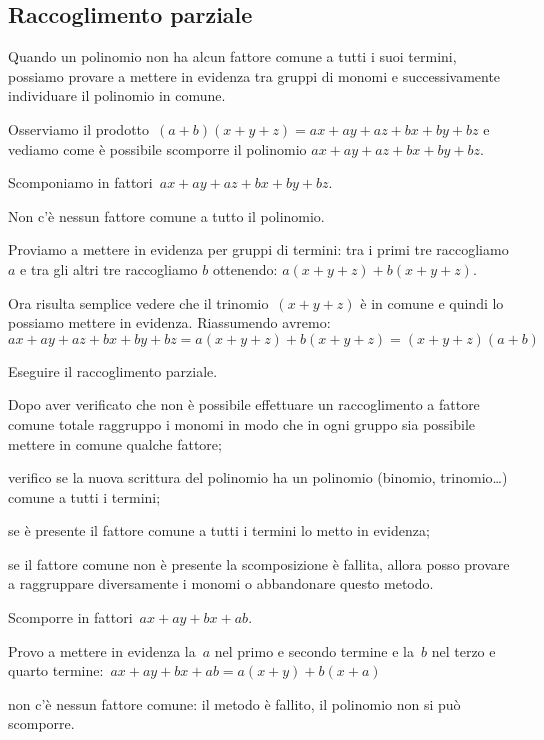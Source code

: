 \subsection{Raccoglimento parziale}
\label{subsec:divpol_raccoglimentoparziale}

Quando un polinomio non ha alcun fattore comune a tutti i suoi termini, 
possiamo provare a mettere in evidenza tra gruppi di monomi
e successivamente individuare il polinomio in comune.

Osserviamo il prodotto~\((a+b)(x+y+z)=ax+ay+az+bx+by+bz\) e
vediamo come è possibile scomporre il polinomio 
\(ax+ay+az+bx+by+bz\).

 \begin{esempio}
Scomponiamo in fattori~\(ax+ay+az+bx+by+bz\). 

Non c'è nessun fattore comune a tutto il polinomio.

Proviamo a mettere in evidenza per gruppi di termini: tra i primi tre 
raccogliamo \(a\) e tra gli altri tre raccogliamo \(b\) ottenendo:
\(a(x+y+z)+b(x+y+z)\). 

Ora risulta semplice vedere che il trinomio~\((x+y+z)\) è in comune e quindi 
lo possiamo mettere in evidenza. Riassumendo avremo:
\[ax+ay+az+bx+by+bz=a(x+y+z)+b(x+y+z)=(x+y+z)(a+b)\]
 \end{esempio}

\begin{procedura}
Eseguire il raccoglimento parziale.
\begin{enumeratea}
\item Dopo aver verificato che non è possibile effettuare un raccoglimento a 
 fattore comune totale raggruppo i monomi in modo che in ogni gruppo sia 
 possibile mettere in comune qualche fattore;
\item verifico se la nuova scrittura del polinomio ha un polinomio 
 (binomio, trinomio\ldots) comune a tutti i termini;
\item se è presente il fattore comune a tutti i termini lo metto in evidenza;
\item se il fattore comune non è presente la scomposizione è fallita, allora 
 posso provare a raggruppare diversamente i monomi o abbandonare questo metodo.
\end{enumeratea}
\end{procedura}

 \begin{esempio}
Scomporre in fattori~\(ax+ay+bx+ab\).
  \begin{enumeratea}
  \item Provo a mettere in evidenza la~\(a\) nel primo e secondo termine e 
   la~\(b\) nel terzo e quarto termine:~\(ax+ay+bx+ab=a(x+y)+b(x+a)\)
  \item non c'è nessun fattore comune: il metodo è fallito, il polinomio non 
si può scomporre.
  \end{enumeratea}
 \end{esempio}

